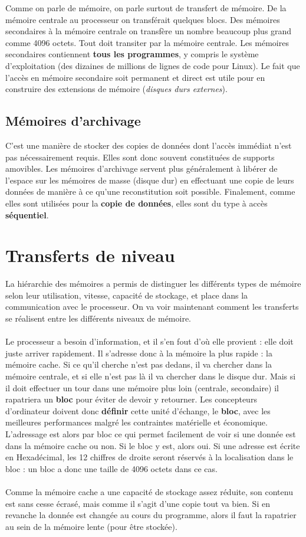 \documentclass[12pt,a4paper]{report}
\begin{document}
Comme on parle de mémoire, on parle surtout de transfert de mémoire. De la mémoire centrale au processeur on transférait quelques blocs. Des mémoires secondaires à la mémoire centrale on transfère un nombre beaucoup plus grand comme 4096 octets. Tout doit transiter par la mémoire centrale. Les mémoires secondaires contiennent \textbf{tous les programmes}, y compris le système d'exploitation (des dizaines de millions de lignes de code pour Linux). Le fait que l'accès en mémoire secondaire soit permanent et direct est utile pour en construire des extensions de mémoire (\textit{disques durs externes}).
\subsection{Mémoires d'archivage}
C'est une manière de stocker des copies de données dont l'accès immédiat n'est pas nécessairement requis. Elles sont donc souvent constituées de supports amovibles. Les mémoires d'archivage servent plus généralement à libérer de l'espace sur les mémoires de masse (disque dur) en effectuant une copie de leurs données de manière à ce qu'une reconstitution soit possible. Finalement, comme elles sont utilisées pour la \textbf{copie de données}, elles sont du type à accès \textbf{séquentiel}.

\section{Transferts de niveau}
La hiérarchie des mémoires a permis de distinguer les différents types de mémoire selon leur utilisation, vitesse, capacité de stockage, et place dans la communication avec le processeur. On va voir maintenant comment les transferts se réalisent entre les différents niveaux de mémoire.  \\
\\
Le processeur a besoin d'information, et il s'en fout d'où elle provient : elle doit juste arriver rapidement. Il s'adresse donc à la mémoire la plus rapide : la mémoire cache. Si ce qu'il cherche n'est pas dedans, il va chercher dans la mémoire centrale, et si elle n'est pas là il va chercher dans le disque dur. Mais si il doit effectuer un tour dans une mémoire plus loin (centrale, secondaire) il rapatriera un \textbf{bloc} pour éviter de devoir y retourner. Les concepteurs d'ordinateur doivent donc \textbf{définir} cette unité d'échange, le \textbf{bloc}, avec les meilleures performances malgré les contraintes matérielle et économique. L'adressage est alors par bloc ce qui permet facilement de voir si une donnée est dans la mémoire cache ou non. Si le bloc y est, alors oui. Si une adresse est écrite en Hexadécimal, les 12 chiffres de droite seront réservés à la localisation dans le bloc : un bloc a donc une taille de 4096 octets dans ce cas. \\ \\
Comme la mémoire cache a une capacité de stockage assez réduite, son contenu est sans cesse écrasé, mais comme il s'agit d'une copie tout va bien. Si en revanche la donnée est changée au cours du programme, alors il faut la rapatrier au sein de la mémoire lente (pour être stockée).
\end{document}
